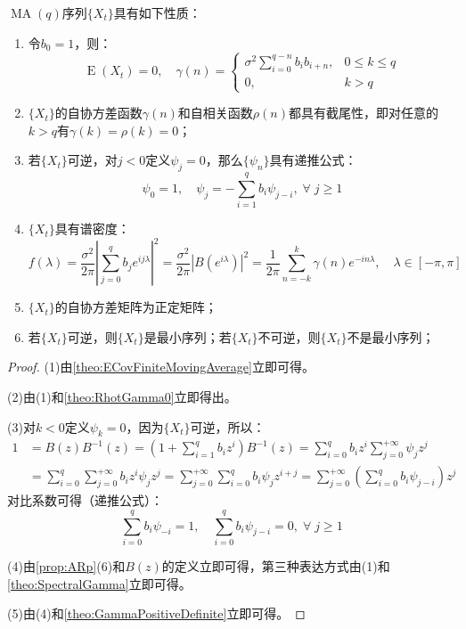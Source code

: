 \begin{property}
	$\operatorname{MA}(q)$序列$\{X_t\}$具有如下性质：
	\begin{enumerate}
		\item 令$b_0=1$，则：
		\begin{equation*}
			\operatorname{E}(X_t)=0,\quad\gamma(n)=
			\begin{cases}
				\sigma^2\sum\limits_{i=0}^{q-n}b_ib_{i+n},&0\leqslant k\leqslant q \\
				0, &k>q
			\end{cases}
		\end{equation*}
		\item $\{X_t\}$的自协方差函数$\gamma(n)$和自相关函数$\rho(n)$都具有截尾性，即对任意的$k>q$有$\gamma(k)=\rho(k)=0$；
		\item 若$\{X_t\}$可逆，对$j<0$定义$\psi_j=0$，那么$\{\psi_n\}$具有递推公式：
		\begin{equation*}
			\psi_0=1,\quad\psi_j=-\sum_{i=1}^{q}b_i\psi_{j-i},\;\forall\;j\geqslant1
		\end{equation*}
		\item $\{X_t\}$具有谱密度：
		\begin{equation*}
			f(\lambda)=\frac{\sigma^2}{2\pi}\left|\sum_{j=0}^{q}b_je^{ij\lambda}\right|^2=\frac{\sigma^2}{2\pi}|B(e^{i\lambda})|^2=\frac{1}{2\pi}\sum_{n=-k}^{k}\gamma(n)e^{-in\lambda},\quad\lambda\in[-\pi,\pi]
		\end{equation*}
		\item $\{X_t\}$的自协方差矩阵为正定矩阵；
		\item 若$\{X_t\}$可逆，则$\{X_t\}$是最小序列；若$\{X_t\}$不可逆，则$\{X_t\}$不是最小序列；
	\end{enumerate}
\end{property}
\begin{proof}
	(1)由\cref{theo:ECovFiniteMovingAverage}立即可得。\par
	(2)由(1)和\cref{theo:RhotGamma0}立即得出。\par
	(3)对$k<0$定义$\psi_k=0$，因为$\{X_t\}$可逆，所以：
	\begin{align*}
		1&=B(z)B^{-1}(z)=\left(1+\sum_{i=1}^{q}b_iz^i\right)B^{-1}(z)=\sum_{i=0}^{q}b_iz^i\sum_{j=0}^{+\infty}\psi_jz^j \\
		&=\sum_{i=0}^{q}\sum_{j=0}^{+\infty}b_iz^i\psi_jz^j=\sum_{j=0}^{+\infty}\sum_{i=0}^{q}b_i\psi_jz^{i+j}=\sum_{j=0}^{+\infty}\left(\sum_{i=0}^{q}b_i\psi_{j-i}\right)z^j
	\end{align*}
	对比系数可得（递推公式）：
	\begin{equation*}
		\sum_{i=0}^{q}b_i\psi_{-i}=1,\quad\sum_{i=0}^{q}b_i\psi_{j-i}=0,\;\forall\;j\geqslant1
	\end{equation*}\par
	(4)由\cref{prop:ARp}(6)和$B(z)$的定义立即可得，第三种表达方式由(1)和\cref{theo:SpectralGamma}立即可得。\par
	(5)由(4)和\cref{theo:GammaPositiveDefinite}立即可得。
\end{proof}

